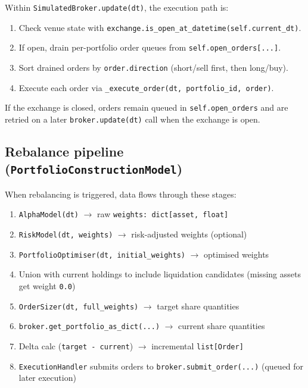\documentclass[11pt]{article}
\begin{document}
Within \texttt{SimulatedBroker.update(dt)}, the execution path is:

\begin{enumerate}[leftmargin=*]
  \item Check venue state with \texttt{exchange.is\_open\_at\_datetime(self.current\_dt)}.
  \item If open, drain per-portfolio order queues from \texttt{self.open\_orders[...]}.
  \item Sort drained orders by \texttt{order.direction} (short/sell first, then long/buy).
  \item Execute each order via \texttt{\_execute\_order(dt, portfolio\_id, order)}.
\end{enumerate}

If the exchange is closed, orders remain queued in \texttt{self.open\_orders} and are retried on a later \texttt{broker.update(dt)} call when the exchange is open.

\subsection{Rebalance pipeline (\texttt{PortfolioConstructionModel})}

When rebalancing is triggered, data flows through these stages:

\begin{enumerate}[leftmargin=*]
  \item \texttt{AlphaModel(dt)} $\rightarrow$ raw \texttt{weights: dict[asset, float]}
  \item \texttt{RiskModel(dt, weights)} $\rightarrow$ risk-adjusted weights (optional)
  \item \texttt{PortfolioOptimiser(dt, initial\_weights)} $\rightarrow$ optimised weights
  \item Union with current holdings to include liquidation candidates (missing assets get weight \texttt{0.0})
  \item \texttt{OrderSizer(dt, full\_weights)} $\rightarrow$ target share quantities
  \item \texttt{broker.get\_portfolio\_as\_dict(...)} $\rightarrow$ current share quantities
  \item Delta calc (\texttt{target - current}) $\rightarrow$ incremental \texttt{list[Order]}
  \item \texttt{ExecutionHandler} submits orders to \texttt{broker.submit\_order(...)} (queued for later execution)
\end{enumerate}
\end{document}

